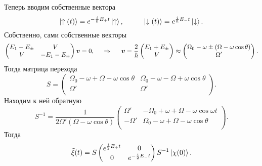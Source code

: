 Теперь вводим собственные вектора
\begin{equation*}
    \ket{\uparrow (t)} = e^{- \frac{i}{\hbar} E_+ t} \ket{\uparrow},
    \hspace{10 mm} 
    \ket{\downarrow (t)} = e^{\frac{i}{\hbar} E_- t} \ket{\downarrow}.
\end{equation*}
Собственно, сами собственные векторы
\begin{equation*}
    \begin{pmatrix}
        E_1 - E_\pm & V  \\
        V & -E_1 - E_\pm  \\
    \end{pmatrix} \mbox{\boldmath $v$} = 0,
    \hspace{0.5cm} \Rightarrow \hspace{0.5cm}   
    \mbox{\boldmath $v$} = \frac{2}{\hbar}\begin{pmatrix}
        E_1 + E_\pm \\ V
    \end{pmatrix} \approx   
    \begin{pmatrix}
        \Omega_0 - \omega \pm (\Omega - \omega \cos \theta) \\
        \Omega'
    \end{pmatrix}.
\end{equation*}
Тогда матрица перехода
\begin{equation*}
    S = \begin{pmatrix}
        \Omega_0 - \omega + \Omega - \omega \cos \theta &  \Omega_0 - \omega - \Omega + \omega \cos \theta  \\
        \Omega' & \Omega'  \\
    \end{pmatrix}.
\end{equation*}
Находим к ней обратную
\begin{equation*}
    S^{-1} = \frac{1}{2 \Omega' (\Omega - \omega \cos \theta)} \begin{pmatrix}
        \Omega' & -\Omega_0 + \omega + \Omega - \omega \cos \omega t  \\
        - \Omega' & \Omega_0 - \omega + \Omega - \omega \cos \theta  \\
    \end{pmatrix}.
\end{equation*}
Тогда
\begin{equation*}
    \tilde{\xi} (t) = S \begin{pmatrix}
        e^{\frac{i}{2} E_+ t} & 0  \\
        0 & e^{- \frac{i}{2} E_- t}  \\
    \end{pmatrix} S^{-1} \left| \chi(0) \right\rangle.
\end{equation*}

